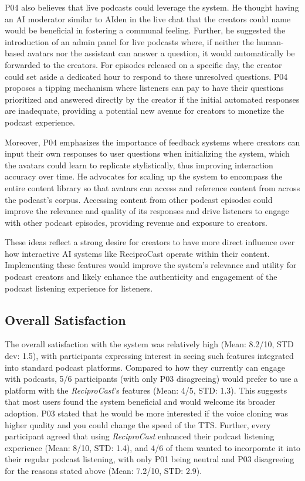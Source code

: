 \documentclass[12pt]{report}
\begin{document}
\begin{myfont}
        \indent P04 also believes that live podcasts could leverage the system. He thought having an AI moderator similar to AIden in the live chat that the creators could name would be beneficial in fostering a communal feeling. Further, he suggested the introduction of an admin panel for live podcasts where, if neither the human-based avatars nor the assistant can answer a question, it would automatically be forwarded to the creators. For episodes released on a specific day, the creator could set aside a dedicated hour to respond to these unresolved questions. P04 proposes a tipping mechanism where listeners can pay to have their questions prioritized and answered directly by the creator if the initial automated responses are inadequate, providing a potential new avenue for creators to monetize the podcast experience.

        \indent Moreover, P04 emphasizes the importance of feedback systems where creators can input their own responses to user questions when initializing the system, which the avatars could learn to replicate stylistically, thus improving interaction accuracy over time. He advocates for scaling up the system to encompass the entire content library so that avatars can access and reference content from across the podcast's corpus. Accessing content from other podcast episodes could improve the relevance and quality of its responses and drive listeners to engage with other podcast episodes, providing revenue and exposure to creators.
        
        \indent These ideas reflect a strong desire for creators to have more direct influence over how interactive AI systems like ReciproCast operate within their content. Implementing these features would improve the system's relevance and utility for podcast creators and likely enhance the authenticity and engagement of the podcast listening experience for listeners.
        
        \subsection{Overall Satisfaction}
        The overall satisfaction with the system was relatively high (Mean: 8.2/10, STD dev: 1.5), with participants expressing interest in seeing such features integrated into standard podcast platforms. Compared to how they currently can engage with podcasts, 5/6 participants (with only P03 disagreeing) would prefer to use a platform with the \textit{ReciproCast}'s features (Mean: 4/5, STD: 1.3). This suggests that most users found the system beneficial and would welcome its broader adoption. P03 stated that he would be more interested if the voice cloning was higher quality and you could change the speed of the TTS. Further, every participant agreed that using \textit{ReciproCast} enhanced their podcast listening experience (Mean: 8/10, STD: 1.4), and 4/6 of them wanted to incorporate it into their regular podcast listening, with only P01 being neutral and P03 disagreeing for the reasons stated above (Mean: 7.2/10, STD: 2.9).\\
        

\end{myfont}
\end{document}
